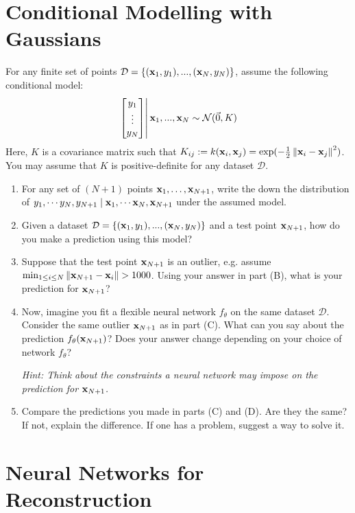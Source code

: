 \documentclass[11pt]{article}
\begin{document}
\newpage 


\section{Conditional Modelling with Gaussians}

For any finite set of points $\mathcal{D}=\{({\mathbf x}_1,y_1),...,({\mathbf x}_N,y_N)\}$, assume the following conditional model:
\[\left.\begin{bmatrix} y_1 \\ \vdots\\y_N \end{bmatrix}\right|{\mathbf x}_1,...,{\mathbf x}_N\sim \mathcal{N}(\vec{0}, K)\]
Here, $K$ is a covariance matrix such that $K_{ij} := k({\mathbf x}_i,{\mathbf x}_j) = \exp(-\frac{1}{2}\left\lVert{\mathbf x}_i-{\mathbf x}_j\right\rVert^2)$. You may assume that $K$ is positive-definite for any dataset $\mathcal{D}$. 

\begin{enumerate}[label=(\Alph*)]

    \item For any set of $(N+1)$ points ${\mathbf x}_1, \dots, {\mathbf x}_{N+1}$, write the down the distribution of $y_1, \cdots y_N, y_{N+1}  \mid  {\mathbf x}_1, \cdots {\mathbf x}_N, {\mathbf x}_{N+1}$ under the assumed model.
    
    
    \item Given a dataset $\mathcal{D}=\{({\mathbf x}_1,y_1),...,({\mathbf x}_N,y_N)\}$ and a test point ${\mathbf x}_{N+1}$, how do you make a prediction using this model?
    
    
    \item Suppose that the test point ${\mathbf x}_{N+1}$ is an outlier, e.g. assume $\min_{1 \leq i \leq N} \left\lVert{\mathbf x}_{N+1} - {\mathbf x}_i\right\rVert > 1000$. Using your answer in part (B), what is your prediction for ${\mathbf x}_{N+1}$?
    
    
    \item Now, imagine you fit a flexible neural network $f_{\theta}$ on the same dataset $\mathcal{D}$. Consider the same outlier ${\mathbf x}_{N+1}$ as in part (C). What can you say about the prediction $f_\theta({\mathbf x}_{N+1})$? Does your answer change depending on your choice of network $f_{\theta}$? 
    
    \textit{Hint: Think about the constraints a neural network may impose on the prediction for ${\mathbf x}_{N+1}$.}
    
    
    \item Compare the predictions you made in parts (C) and (D). Are they the same? If not, explain the difference. If one has a problem, suggest a way to solve it.

\end{enumerate}


\newpage 


\section{Neural Networks for Reconstruction}
\end{document}
